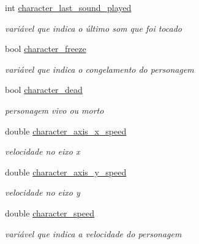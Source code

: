 \begin{DoxyCompactItemize}
int \mbox{\hyperlink{classCharacter_a8fdf09c04765a29d63a1e92620c312bb}{character\+\_\+last\+\_\+sound\+\_\+played}}
\begin{DoxyCompactList}\small\item\em variável que indica o último som que foi tocado \end{DoxyCompactList}\item 
\mbox{\label{classCharacter_ad2a4dbff5a815b1149d827d56c87a3ca}} 
bool \mbox{\hyperlink{classCharacter_ad2a4dbff5a815b1149d827d56c87a3ca}{character\+\_\+freeze}}
\begin{DoxyCompactList}\small\item\em variável que indica o congelamento do personagem \end{DoxyCompactList}\item 
\mbox{\label{classCharacter_a36146a3072561cf6774cf7585c23a686}} 
bool \mbox{\hyperlink{classCharacter_a36146a3072561cf6774cf7585c23a686}{character\+\_\+dead}}
\begin{DoxyCompactList}\small\item\em personagem vivo ou morto \end{DoxyCompactList}\item 
\mbox{\label{classCharacter_a5007dcc89bd0ada538659d13c6db8aae}} 
double \mbox{\hyperlink{classCharacter_a5007dcc89bd0ada538659d13c6db8aae}{character\+\_\+axis\+\_\+x\+\_\+speed}}
\begin{DoxyCompactList}\small\item\em velocidade no eixo x \end{DoxyCompactList}\item 
\mbox{\label{classCharacter_a2166b91a2e1de6360857187e8573823a}} 
double \mbox{\hyperlink{classCharacter_a2166b91a2e1de6360857187e8573823a}{character\+\_\+axis\+\_\+y\+\_\+speed}}
\begin{DoxyCompactList}\small\item\em velocidade no eixo y \end{DoxyCompactList}\item 
\mbox{\label{classCharacter_ad18353901814799f84c2f593cb5d672b}} 
double \mbox{\hyperlink{classCharacter_ad18353901814799f84c2f593cb5d672b}{character\+\_\+speed}}
\begin{DoxyCompactList}\small\item\em variável que indica a velocidade do personagem \end{DoxyCompactList}\item 

\end{DoxyCompactItemize}
